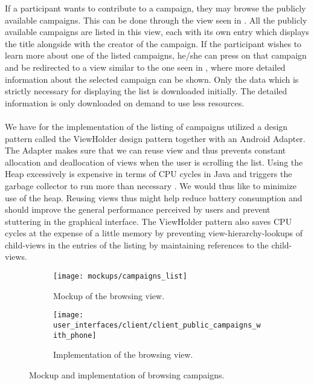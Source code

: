 If a participant wants to contribute to a campaign, they may browse the publicly available campaigns. This can be done through the view seen in . All the publicly available campaigns are listed in this view, each with its own entry which displays the title alongside with the creator of the campaign. If the participant wishes to learn more about one of the listed campaigns, he/she can press on that campaign and be redirected to a view similar to the one seen in , where more detailed information about the selected campaign can be shown. Only the data which is strictly necessary for displaying the list is downloaded initially. The detailed information is only downloaded on demand to use less resources.
\\\\
We have for the implementation of the listing of campaigns utilized a design pattern called the ViewHolder design pattern \parencite{view_holder_pattern} together with an Android Adapter. The Adapter makes sure that we can reuse view and thus prevents constant allocation and deallocation of views when the user is scrolling the list. Using the Heap excessively is expensive in terms of CPU cycles in Java and triggers the garbage collector to run more than necessary \parencite{android_garbage_collection}. We would thus like to minimize use of the heap. Reusing views thus might help reduce battery consumption and should improve the general performance perceived by users and prevent stuttering in the graphical interface. The ViewHolder pattern also saves CPU cycles at the expense of a little memory by preventing view-hierarchy-lookups of child-views in the entries of the listing by maintaining references to the child-views.

\begin{figure}[!htbp]
    \begin{subfigure}[!t]{.48\textwidth}
        \centering
        \texttt{[image: mockups/campaigns\_list]}
        \caption{Mockup of the browsing view.}
        \label{fig:mockup_public_campaigns}
    \end{subfigure}%
    \begin{subfigure}[!t]{.52\textwidth}
        \centering
        \texttt{[image: user\_interfaces/client/client\_public\_campaigns\_with\_phone]}
        \caption{Implementation of the browsing view.}
        \label{fig:implementation_public_campaigns}
    \end{subfigure}
    \caption{Mockup and implementation of browsing campaigns.}
    \label{fig:public_campaigns}
\end{figure}
\FloatBarrier

